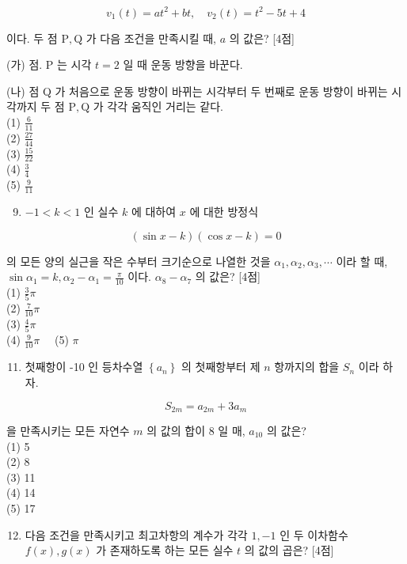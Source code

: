 \documentclass[10pt]{article}
\begin{document}
\[
v_{1}(t)=a t^{2}+b t, \quad v_{2}(t)=t^{2}-5 t+4
\]

이다. 두 점 \(\mathrm{P}, \mathrm{Q}\) 가 다음 조건을 만족시킬 때, \(a\) 의 값은? [4점]

(가) 점. P 는 시각 \(t=2\) 일 때 운동 방향을 바꾼다.

(나) 점 Q 가 처음으로 운동 방향이 바뀌는 시각부터 두 번째로 운동 방향이 바뀌는 시각까지 두 점 \(\mathrm{P}, \mathrm{Q}\) 가 각각 움직인 거리는 같다.\\
(1) \(\frac{6}{11}\)\\
(2) \(\frac{27}{44}\)\\
(3) \(\frac{15}{22}\)\\
(4) \(\frac{3}{4}\)\\
(5) \(\frac{9}{11}\)

\begin{enumerate}
  \setcounter{enumi}{8}
  \item \(-1<k<1\) 인 실수 \(k\) 에 대하여 \(x\) 에 대한 방정식
\end{enumerate}

\[
(\sin x-k)(\cos x-k)=0
\]

의 모든 양의 실근을 작은 수부터 크기순으로 나열한 것을 \(\alpha_{1}, \alpha_{2}, \alpha_{3}, \cdots\) 이라 할 때, \(\sin \alpha_{1}=k, \alpha_{2}-\alpha_{1}=\frac{\pi}{10}\) 이다. \(\alpha_{8}-\alpha_{7}\) 의 값은? [4점]\\
(1) \(\frac{3}{5} \pi\)\\
(2) \(\frac{7}{10} \pi\)\\
(3) \(\frac{4}{5} \pi\)\\
(4) \(\frac{9}{10} \pi \quad\) (5) \(\pi\)

\begin{enumerate}
  \setcounter{enumi}{10}
  \item 첫째항이 -10 인 등차수열 \(\left\{a_{n}\right\}\) 의 첫째항부터 제 \(n\) 항까지의 합을 \(S_{n}\) 이라 하자.
\end{enumerate}

\[
S_{2 m}=a_{2 m}+3 a_{m}
\]

을 만족시키는 모든 자연수 \(m\) 의 값의 합이 8 일 매, \(a_{10}\) 의 값은?\\
(1) 5\\
(2) 8\\
(3) 11\\
(4) 14\\
(5) 17

\begin{enumerate}
  \setcounter{enumi}{11}
  \item 다음 조건을 만족시키고 최고차항의 계수가 각각 \(1,-1\) 인 두 이차함수 \(f(x), g(x)\) 가 존재하도록 하는 모든 실수 \(t\) 의 값의 곱은? [4점]
\end{enumerate}
\end{document}
